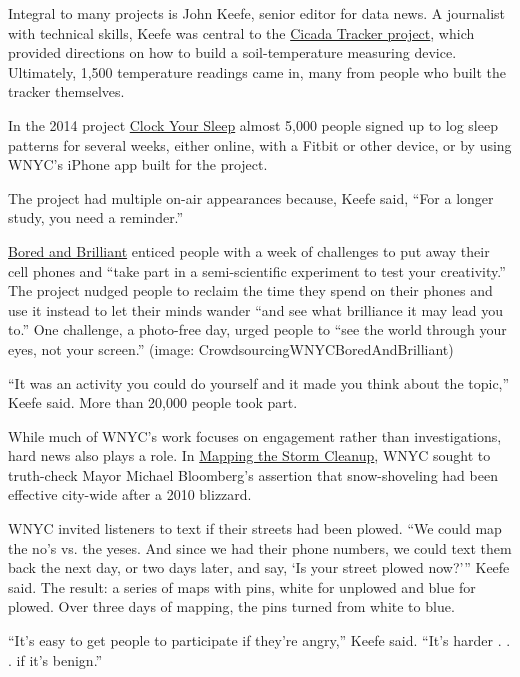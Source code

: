 \begin{itemize}
Integral to many projects is John Keefe, senior editor for data news. A journalist with technical skills, Keefe was central to the \href{http://project.wnyc.org/cicadas/}{Cicada Tracker project}, which provided directions on how to build a soil-temperature measuring device.\autocite{Cicadas} Ultimately, 1,500 temperature readings came in, many from people who built the tracker themselves.\autocite{Keefe}

In the 2014 project \href{http://www.wnyc.org/story/clock-your-sleep-findings/}{Clock Your Sleep}\autocite{Sleep} almost 5,000 people signed up to log sleep patterns for several weeks, either online, with a Fitbit or other device, or by using WNYC’s iPhone app built for the project. 

The project had multiple on-air appearances because, Keefe said, ``For a longer study, you need a reminder.''

\href{http://www.wnyc.org/series/bored-and-brilliant/}{Bored and Brilliant}\autocite{Bored} enticed people with a week of challenges to put away their cell phones and ``take part in a semi-scientific experiment to test your creativity.'' The project nudged people to reclaim the time they spend on their phones and use it instead to let their minds wander ``and see what brilliance it may lead you to.” One challenge, a photo-free day, urged people to “see the world through your eyes, not your screen.'' (image: CrowdsourcingWNYCBoredAndBrilliant)

``It was an activity you could do yourself and it made you think about the topic,'' Keefe said. More than 20,000 people took part.

While much of WNYC’s work focuses on engagement rather than investigations, hard news also plays a role. In \href{http://www.wnyc.org/story/105548-2-mapping-storm-clean-/}{Mapping the Storm Cleanup}, WNYC sought to truth-check Mayor Michael Bloomberg’s assertion that snow-shoveling had been effective city-wide after a 2010 blizzard.\autocite{Storm} 

WNYC invited listeners to text if their streets had been plowed. ``We could map the no’s vs. the yeses. And since we had their phone numbers, we could text them back the next day, or two days later, and say, ‘Is your street plowed now?’'' Keefe said. The result: a series of maps with pins, white for unplowed and blue for plowed. Over three days of mapping, the pins turned from white to blue. 

``It’s easy to get people to participate if they’re angry,'' Keefe said. ``It’s harder . . . if it’s benign.''


\end{itemize}
